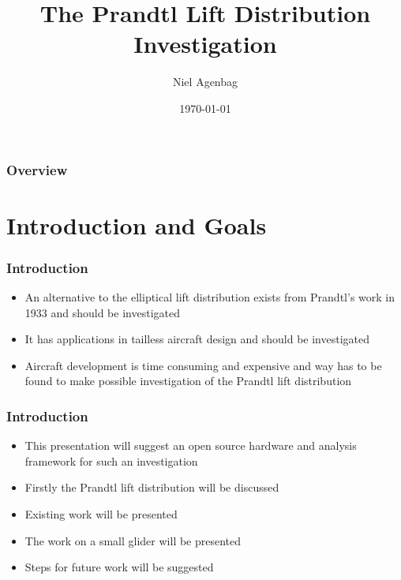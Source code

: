 \documentclass{beamer}
\title[Prandtl Investigation]{The Prandtl Lift Distribution Investigation} %
\author{Niel Agenbag} %
\institute[Unaffiliated] %
{
Unaffiliated \\ %
\medskip
\textit{Ludwigprandtlwing@gmail.com} %
}
\date{\today} %
\begin{document}
\begin{frame}
\titlepage %
\end{frame}

\begin{frame}
\frametitle{Overview} %
\tableofcontents %
\end{frame}


\section{Introduction and Goals}

\begin{frame}
\frametitle{Introduction}
\begin{itemize}
\item An alternative to the elliptical lift distribution exists from Prandtl's work in 1933 \cite{Prandtl1933} and should be investigated 
\item It has applications in tailless aircraft design and should be investigated
\item Aircraft development is time consuming and expensive and way has to be found to make possible investigation of the Prandtl lift distribution
\end{itemize}
\end{frame}

\begin{frame}
\frametitle{Introduction}
\begin{itemize}
\item This presentation will suggest an open source hardware and analysis framework for such an investigation 
\item Firstly the Prandtl lift distribution will be discussed
\item Existing work will be presented
\item The work on a small glider will be presented
\item Steps for future work will be suggested
\end{itemize}
\end{frame}
\end{document}
